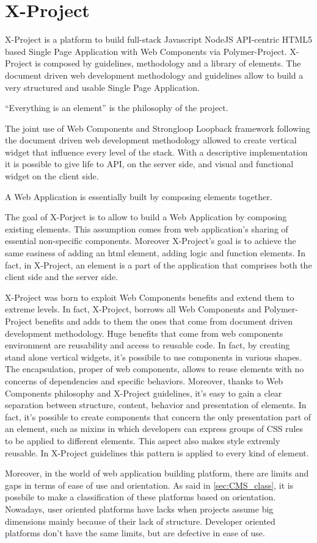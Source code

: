 \section{X-Project}
\label{sec:XPR_xpr}

X-Project is a platform to build full-stack Javascript NodeJS API-centric HTML5 based Single Page Application with Web Components via Polymer-Project.
X-Project is composed by guidelines, methodology and a library of elements.
The document driven web development methodology and guidelines allow to build a very structured and usable Single Page Application.

``Everything is an element'' is the philosophy of the project.

The joint use of Web Components and Strongloop Loopback framework following the document driven web development methodology allowed to create vertical widget that influence every level of the stack. With a descriptive implementation it is possible to give life to API, on the server side, and visual and functional widget on the client side.

A Web Application is essentially built by composing elements together.

The goal of X-Porject is to allow to build a Web Application by composing existing elements. This assumption comes from web application's sharing of essential non-specific components.
Moreover X-Project's goal is to achieve the same easiness of adding an html element, adding logic and function elements.
In fact, in X-Project, an element is a part of the application that comprises both the client side and the server side.

X-Project was born to exploit Web Components benefits and extend them to extreme levels. In fact, X-Project, borrows all Web Components and Polymer-Project benefits and adds to them the ones that come from document driven development methodology.
Huge benefits that come from web components environment are reusability and access to reusable code. In fact, by creating stand alone vertical widgets, it's possibile to use components in various shapes.
The encapsulation, proper of web components, allows to reuse elements with no concerns of dependencies and specific behaviors.
Moreover, thanks to Web Components philosophy and X-Project guidelines, it's easy to gain a clear separation between structure, content, behavior and presentation of elements. 
In fact, it's possible to create components that concern the only presentation part of an element, such as mixins in which developers can express groups of CSS rules to be applied to different elements. This aspect also makes style extremly reusable.
In X-Project guidelines this pattern is applied to every kind of element.

Moreover, in the world of web application building platform, there are limits and gaps in terms of ease of use and orientation. As said in \ref{sec:CMS_class}, it is possbile to make a classification of these platforms based on orientation. Nowadays, user oriented platforms have lacks when projects assume big dimensions mainly because of their lack of structure. Developer oriented platforms don't have the same limits, but are defective in ease of use. 

